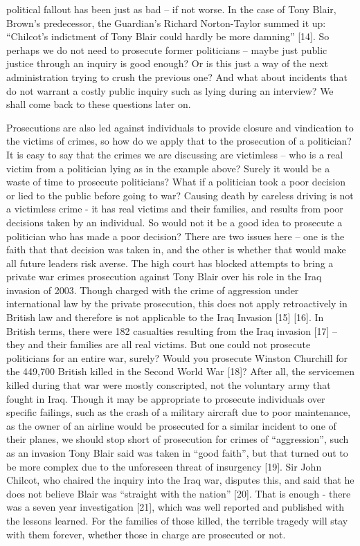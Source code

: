 \documentclass[11pt,a4paper]{report}
\begin{document}
\begin{multicols}{2}
political fallout has been just as bad – if not worse. In the case of Tony Blair, Brown’s predecessor, the Guardian’s Richard Norton-Taylor summed it up: “Chilcot's indictment of Tony Blair could hardly be more damning” [14]. So perhaps we do not need to prosecute former politicians – maybe just public justice through an inquiry is good enough? Or is this just a way of the next administration trying to crush the previous one? And what about incidents that do not warrant a costly public inquiry such as lying during an interview? We shall come back to these questions later on. 
		
		Prosecutions are also led against individuals to provide closure and vindication to the victims of crimes, so how do we apply that to the prosecution of a politician? It is easy to say that the crimes we are discussing are victimless – who is a real victim from a politician lying as in the example above? Surely it would be a waste of time to prosecute politicians? What if a politician took a poor decision or lied to the public before going to war? Causing death by careless driving is not a victimless crime - it has real victims and their families, and results from poor decisions taken by an individual. So would not it be a good idea to prosecute a politician who has made a poor decision? There are two issues here – one is the faith that that decision was taken in, and the other is whether that would make all future leaders risk averse. The high court has blocked attempts to bring a private war crimes prosecution against Tony Blair over his role in the Iraq invasion of 2003. Though charged with the crime of aggression under international law by the private prosecution, this does not apply retroactively in British law and therefore is not applicable to the Iraq Invasion [15] [16]. In British terms, there were 182 casualties resulting from the Iraq invasion [17] – they and their families are all real victims. But one could not prosecute politicians for an entire war, surely? Would you prosecute Winston Churchill for the 449,700 British killed in the Second World War [18]? After all, the servicemen killed during that war were mostly conscripted, not the voluntary army that fought in Iraq. Though it may be appropriate to prosecute individuals over specific failings, such as the crash of a military aircraft due to poor maintenance, as the owner of an airline would be prosecuted for a similar incident to one of their planes, we should stop short of prosecution for crimes of “aggression”, such as an invasion Tony Blair said was taken in “good faith”, but that turned out to be more complex due to the unforeseen threat of insurgency [19]. Sir John Chilcot, who chaired the inquiry into the Iraq war, disputes this, and said that he does not believe Blair was “straight with the nation” [20]. That is enough -  there was a seven year investigation [21], which was well reported and published with the lessons learned. For the families of those killed, the terrible tragedy will stay with them forever, whether those in charge are prosecuted or not. 
		

\end{multicols}
\end{document}
